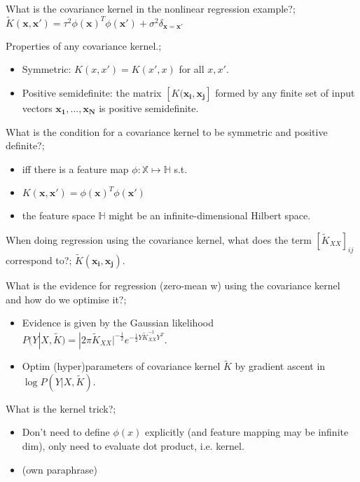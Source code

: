 \documentclass{article}
\begin{document}
What is the covariance kernel in the nonlinear regression example?; $\tilde{K}(\mathbf{x, x'})=\tau^2\phi(\mathbf{x})^T\phi(\mathbf{x}')+\sigma^2\delta_{\mathbf{x}=\mathbf{x}'}$

Properties of any covariance kernel.; \begin{itemize} \item Symmetric: $K(x, x')=K(x', x)$ for all $x, x'$.  \item Positive semidefinite: the matrix $[K(\mathbf{x_i, x_j}]$ formed by any finite set of input vectors $\mathbf{x_1, ..., x_N}$ is positive semidefinite.  \end{itemize}

What is the condition for a covariance kernel to be symmetric and positive definite?; \begin{itemize} \item iff there is a feature map $\phi:\mathbb{X}\mapsto\mathbb{H}$ s.t.  \item $K(\mathbf{x, x'})=\phi(\mathbf{x})^T\phi(\mathbf{x'})$ \item the feature space $\mathbb{H}$ might be an infinite-dimensional Hilbert space.  \end{itemize}

When doing regression using the covariance kernel, what does the term $[\tilde{K}_{XX}]_{ij}$ correspond to?; $\tilde{K}(\mathbf{x_i, x_j})$.

What is the evidence for regression (zero-mean w) using the covariance kernel and how do we optimise it?; \begin{itemize} \item Evidence is given by the Gaussian likelihood $P(Y|X, \tilde{K})=|2\pi\tilde{K}_{XX}|^{-\frac{1}{2}}e^{-\frac{1}{2}Y\tilde{K}_{XX}^{-1}Y^T}$.  \item Optim (hyper)parameters of covariance kernel $\tilde{K}$ by gradient ascent in $\log P(Y|X, \tilde{K})$.  \end{itemize} 

What is the kernel trick?; \begin{itemize} \item Don't need to define $\phi(x)$ explicitly (and feature mapping may be infinite dim), only need to evaluate dot product, i.e. kernel.  \item (own paraphrase) \end{itemize}
\end{document}
